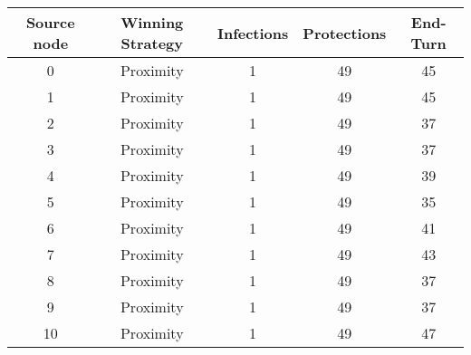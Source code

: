 \documentclass[results.tex]{subfiles}
\begin{document}
    \begin{center}
        \begin{tabular}{| c || c | c | c | c |}
            \hline
            {\bfseries Source node} & {\bfseries Winning Strategy} & {\bfseries Infections} & {\bfseries Protections}
            & {\bfseries End-Turn}
            \\  %
            \hline\hline
            0                       & Proximity                    & 1                      & 49                      & 45                   \\
            \hline
            1                       & Proximity                    & 1                      & 49                      & 45                   \\
            \hline
            2                       & Proximity                    & 1                      & 49                      & 37                   \\
            \hline
            3                       & Proximity                    & 1                      & 49                      & 37                   \\
            \hline
            4                       & Proximity                    & 1                      & 49                      & 39                   \\
            \hline
            5                       & Proximity                    & 1                      & 49                      & 35                   \\
            \hline
            6                       & Proximity                    & 1                      & 49                      & 41                   \\
            \hline
            7                       & Proximity                    & 1                      & 49                      & 43                   \\
            \hline
            8                       & Proximity                    & 1                      & 49                      & 37                   \\
            \hline
            9                       & Proximity                    & 1                      & 49                      & 37                   \\
            \hline
            10                      & Proximity                    & 1                      & 49                      & 47                   \\

\end{tabular}
\end{center}
\end{document}
